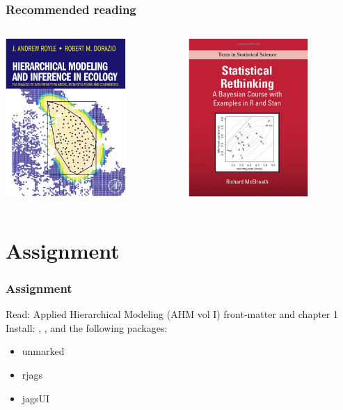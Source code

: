 \documentclass[color=usenames,dvipsnames]{beamer}\usepackage[]{graphicx}\usepackage[]{xcolor}
\begin{document}
\begin{frame}
\begin{columns}
\begin{column}{0.33\textwidth}
    \end{column} 
  \end{columns} 
\end{frame}


\begin{frame}
  \frametitle{Recommended reading}
  \begin{columns}[c]
    \setlength\fboxsep{0pt}
    \begin{column}{0.5\textwidth}
      \centering
      \includegraphics[height=6cm]{figs/RoyleDorazioBookCover} \\
    \end{column}
    \hfill
    \begin{column}{0.5\textwidth}
      \centering
      \includegraphics[height=6cm]{figs/McElreathBookCover} \\
    \end{column}
  \end{columns}
\end{frame}



\section{Assignment}


\begin{frame}
  \frametitle{Assignment}
  \large
  Read: Applied Hierarchical Modeling (AHM vol I) front-matter and chapter 1 \\
  \vfill
  Install: \href{https://sourceforge.net/projects/mcmc-jags/files/}{\jags},
  \href{https://www.r-project.org/}{\R}, and the following packages:
  \begin{itemize}
    \tt
    \item unmarked
    \item rjags
    \item jagsUI
  \end{itemize}
\end{frame}
\end{document}
